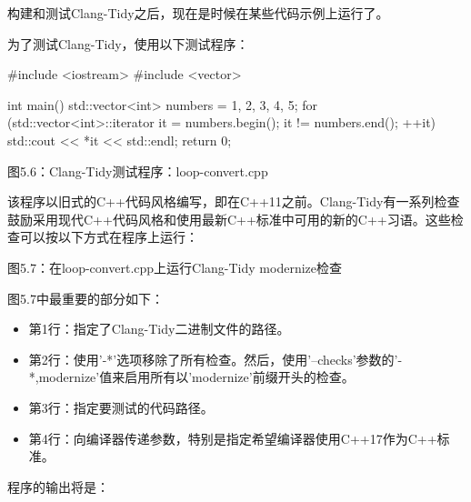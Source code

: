 构建和测试Clang-Tidy之后，现在是时候在某些代码示例上运行了。


为了测试Clang-Tidy，使用以下测试程序：

\begin{cpp}
#include <iostream>
#include <vector>

int main() {
  std::vector<int> numbers = {1, 2, 3, 4, 5};
  for (std::vector<int>::iterator it = numbers.begin(); it != numbers.end();
    ++it) {
    std::cout << *it << std::endl;
  }
  return 0;
}
\end{cpp}

\begin{center}
图5.6：Clang-Tidy测试程序：loop-convert.cpp
\end{center}

该程序以旧式的C++代码风格编写，即在C++11之前。Clang-Tidy有一系列检查鼓励采用现代C++代码风格和使用最新C++标准中可用的新的C++习语。这些检查可以按以下方式在程序上运行：


\begin{center}
图5.7：在loop-convert.cpp上运行Clang-Tidy modernize检查
\end{center}

图5.7中最重要的部分如下：

\begin{itemize}
\item
第1行：指定了Clang-Tidy二进制文件的路径。

\item
第2行：使用'-*'选项移除了所有检查。然后，使用'–checks'参数的'-*,modernize'值来启用所有以'modernize'前缀开头的检查。

\item
第3行：指定要测试的代码路径。

\item
第4行：向编译器传递参数，特别是指定希望编译器使用C++17作为C++标准。
\end{itemize}

程序的输出将是：

